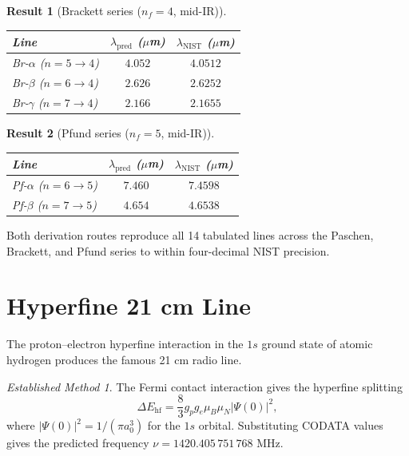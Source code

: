 \documentclass[twocolumn,11pt,a4paper]{article}
\theoremstyle{stmtstyle}
\newtheorem{result}{Result}
\theoremstyle{definition}
\theoremstyle{remark}
\newtheorem*{established}{Established Method}
\begin{document}
\begin{result}[Brackett series ($n_{f}=4$, mid-IR)]\label{res:brackett}
\begin{center}\small
\begin{tabular}{lcc}
\toprule
Line & $\lambda_{\mathrm{pred}}$ ($\mu$m) & $\lambda_{\mathrm{NIST}}$ ($\mu$m)\\
\midrule
Br-$\alpha$ ($n=5\to 4$) & $4.052$ & $4.0512$\\
Br-$\beta$ ($n=6\to 4$)  & $2.626$ & $2.6252$\\
Br-$\gamma$ ($n=7\to 4$) & $2.166$ & $2.1655$\\
\bottomrule
\end{tabular}
\end{center}
\end{result}

\begin{result}[Pfund series ($n_{f}=5$, mid-IR)]\label{res:pfund}
\begin{center}\small
\begin{tabular}{lcc}
\toprule
Line & $\lambda_{\mathrm{pred}}$ ($\mu$m) & $\lambda_{\mathrm{NIST}}$ ($\mu$m)\\
\midrule
Pf-$\alpha$ ($n=6\to 5$) & $7.460$ & $7.4598$\\
Pf-$\beta$ ($n=7\to 5$)  & $4.654$ & $4.6538$\\
\bottomrule
\end{tabular}
\end{center}
\end{result}

Both derivation routes reproduce all 14 tabulated lines across the Paschen, Brackett, and Pfund series to within four-decimal NIST precision.

\section{Hyperfine 21 cm Line}
\label{sec:hhyperfine}

The proton--electron hyperfine interaction in the $1s$ ground state of atomic hydrogen produces the famous 21 cm radio line.

\begin{established}
The Fermi contact interaction gives the hyperfine splitting
\begin{equation}
\Delta E_{\mathrm{hf}}=\frac{8}{3}g_{p}g_{e}\mu_{B}\mu_{N}|\Psi(0)|^{2},
\end{equation}
where $|\Psi(0)|^{2}=1/(\pi a_{0}^{3})$ for the $1s$ orbital. Substituting CODATA values \citep{codata2022,karshenboim2005} gives the predicted frequency $\nu=1420.405\,751\,768$ MHz.
\end{established}
\end{document}
